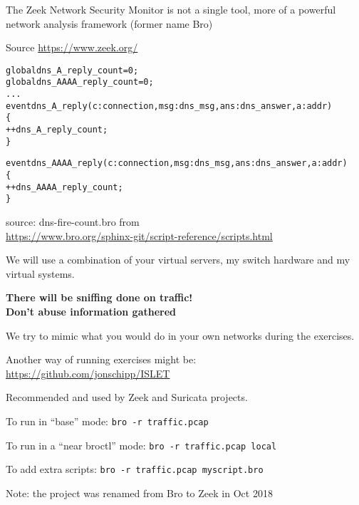 \documentclass[Screen16to9,17pt]{foils}
\begin{document}


The Zeek Network Security Monitor is not a single tool, more of a
powerful network analysis framework (former name Bro)

{\small Source \url{https://www.zeek.org/}}


\begin{alltt}\small
global dns_A_reply_count=0;
global dns_AAAA_reply_count=0;
...
event dns_A_reply(c: connection, msg: dns_msg, ans: dns_answer, a: addr)
        \{
        ++dns_A_reply_count;
        \}

event dns_AAAA_reply(c: connection, msg: dns_msg, ans: dns_answer, a: addr)
        \{
        ++dns_AAAA_reply_count;
        \}
\end{alltt}

source: dns-fire-count.bro from\\
{\small {}
\url{https://www.bro.org/sphinx-git/script-reference/scripts.html}}




We will use a combination of your virtual servers, my switch hardware and my virtual systems.

\vskip 1cm
{\Large \bf There will be sniffing done on traffic!\\
Don't abuse information gathered}

We try to mimic what you would do in your own networks during the exercises.

Another way of running exercises might be:\\
\url{https://github.com/jonschipp/ISLET}

Recommended and used by Zeek and Suricata projects.


\begin{list1}
\item To run in “base” mode:
 \verb+bro -r traffic.pcap+
\item To run in a “near broctl” mode:
\verb+bro -r traffic.pcap local+
\item To add extra scripts:
\verb+bro -r traffic.pcap myscript.bro+
\end{list1}

\centerline{Note: the project was renamed from Bro to Zeek in Oct 2018}
\end{document}
